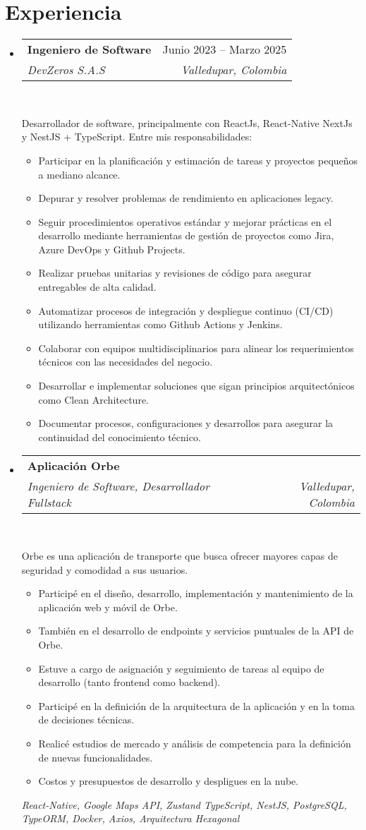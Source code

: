 \documentclass[letterpaper,11pt]{article}
\makeatletter
\newcommand{\resumeItem}[1]{
  \item\small{
    {#1 \vspace{-2pt}}
  }
}
\newcommand{\resumeSubheading}[4]{
  \vspace{-2pt}\item
    \begin{tabular*}{0.97\textwidth}[t]{l@{\extracolsep{\fill}}r}
      \textbf{#1} & #2 \\
      \textit{\small#3} & \textit{\small #4} \\
    \end{tabular*}\vspace{-7pt}
}
\newcommand{\resumeSubHeadingListStart}{\begin{itemize}[leftmargin=0.15in, label={}]}
\newcommand{\resumeSubHeadingListEnd}{\end{itemize}}
\newcommand{\resumeItemListStart}{\begin{itemize}}
\newcommand{\resumeItemListEnd}{\end{itemize}\vspace{-5pt}}
\makeatother
\begin{document}
\section{Experiencia}
  \resumeSubHeadingListStart
    \resumeSubheading
      {Ingeniero de Software}{Junio 2023 -- Marzo 2025}
      {DevZeros S.A.S}{Valledupar, Colombia} \
      \par{Desarrollador de software, principalmente con ReactJs, React-Native NextJs y NestJS  + TypeScript. Entre mis
      responsabilidades:}
     \resumeItemListStart
        \resumeItem{Participar en la planificación y estimación de tareas y proyectos pequeños a mediano alcance.}
        \resumeItem{Depurar y resolver problemas de rendimiento en aplicaciones legacy.}
        \resumeItem{Seguir procedimientos operativos estándar y mejorar prácticas en el desarrollo mediante herramientas de gestión de proyectos como Jira, Azure DevOps y Github Projects.}
        \resumeItem{Realizar pruebas unitarias y revisiones de código para asegurar entregables de alta calidad.}
        \resumeItem{Automatizar procesos de integración y despliegue continuo (CI/CD) utilizando herramientas como Github Actions y Jenkins.}
        \resumeItem{Colaborar con equipos multidisciplinarios para alinear los requerimientos técnicos con las necesidades del negocio.}
        \resumeItem{Desarrollar e implementar soluciones que sigan principios arquitectónicos como Clean Architecture.}
        \resumeItem{Documentar procesos, configuraciones y desarrollos para asegurar la continuidad del conocimiento técnico.}
     \resumeItemListEnd
    \resumeSubheading
        {Aplicación Orbe}{}
        {Ingeniero de Software, Desarrollador Fullstack}{Valledupar, Colombia} \
        \par{Orbe es una aplicación de transporte que busca ofrecer mayores capas de seguridad y comodidad a sus usuarios.} \\
     \resumeItemListStart
        \resumeItem{Participé en el diseño, desarrollo, implementación y mantenimiento de la aplicación web y móvil de Orbe.}
        \resumeItem{ También en el desarrollo de endpoints y servicios puntuales de la API de Orbe.}
        \resumeItem{Estuve a cargo de asignación y seguimiento de tareas al equipo de desarrollo (tanto frontend como backend).}
        \resumeItem{Participé en la definición de la arquitectura de la aplicación y en la toma de decisiones técnicas.}
        \resumeItem{Realicé estudios de mercado y análisis de competencia para la definición de nuevas funcionalidades.}
        \resumeItem{Costos y presupuestos de desarrollo y despligues en la nube.}
     \resumeItemListEnd
        \emph{React-Native, Google Maps API, Zustand TypeScript, NestJS, PostgreSQL, TypeORM, Docker, Axios, Arquitectura Hexagonal}
    \resumeSubHeadingListEnd
\end{document}
